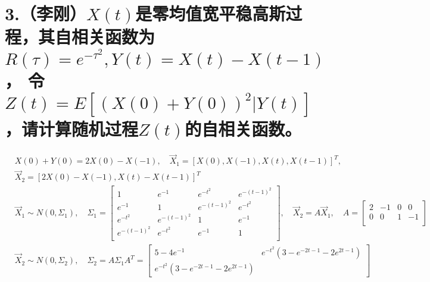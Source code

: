 \documentclass[UTF8]{ctexart}
\begin{document}
\section*{3.（李刚）$X(t)$是零均值宽平稳高斯过程，其自相关函数为$R(\tau)=e^{-\tau^2},Y(t)=X(t)-X(t-1)$，
令$Z(t)=E[(X(0)+Y(0))^2\lvert Y(t)]$，请计算随机过程$Z(t)$的自相关函数。}
\begin{equation*}
  \begin{aligned}
     & X(0)+Y(0)=2X(0)-X(-1),\quad\vec X_1=[X(0),X(-1),X(t),X(t-1)]^T,\quad \\
     & \vec X_2=[2X(0)-X(-1),X(t)-X(t-1)]^T                                 \\
     & \vec X_1\sim N(0,\Sigma_1),\quad\Sigma_1=
    \begin{bmatrix}
      1            & e^{-1}       & e^{-t^2}     & e^{-(t-1)^2} \\
      e^{-1}       & 1            & e^{-(t-1)^2} & e^{-t^2}     \\
      e^{-t^2}     & e^{-(t-1)^2} & 1            & e^{-1}       \\
      e^{-(t-1)^2} & e^{-t^2}     & e^{-1}       & 1            \\
    \end{bmatrix},\quad
    \vec X_2=A\vec X_1,\quad A=
    \begin{bmatrix}
      2 & -1 & 0 & 0  \\
      0 & 0  & 1 & -1 \\
    \end{bmatrix}                                               \\
     & \vec X_2\sim N(0,\Sigma_2),\quad\Sigma_2=A\Sigma_1 A^T=
    \begin{bmatrix}
      5-4e^{-1} & e^{-t^2}(3-e^{-2t-1}-2e^{2t-1}) \\
      e^{-t^2}(3-e^{-2t-1}-2e^{2t-1})
    \end{bmatrix}
  \end{aligned}
\end{equation*}
\end{document}
